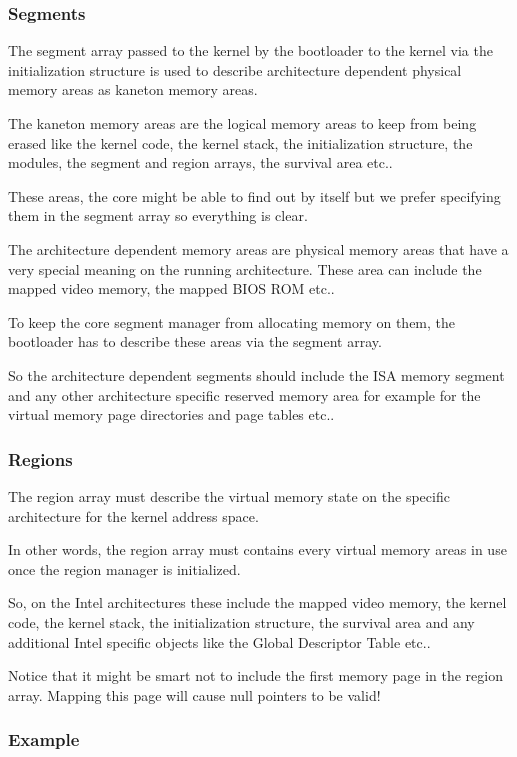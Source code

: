 \subsubsection{Segments}

The segment array passed to the kernel by the bootloader to the kernel via
the initialization structure is used to describe architecture dependent
physical memory areas as kaneton memory areas.

The kaneton memory areas are the logical memory areas to keep from being
erased like the kernel code, the kernel stack, the initialization structure,
the modules, the segment and region arrays, the survival area etc..

These areas, the core might be able to find out by itself but we prefer
specifying them in the segment array so everything is clear.

The architecture dependent memory areas are physical memory areas that
have a very special meaning on the running architecture. These area can
include the mapped video memory, the mapped BIOS ROM etc..

To keep the core segment manager from allocating memory on them, the
bootloader has to describe these areas via the segment array.

So the architecture dependent segments should include the ISA memory segment
and any other architecture specific reserved memory area for example for
the virtual memory page directories and page tables etc..

\subsubsection{Regions}

The region array must describe the virtual memory state on the specific
architecture for the kernel address space.

In other words, the region array must contains every virtual memory
areas in use once the region manager is initialized.

So, on the Intel architectures these include the mapped video memory,
the kernel code, the kernel stack, the initialization structure, the
survival area and any additional Intel specific objects like the Global
Descriptor Table etc..

Notice that it might be smart not to include the first memory page in
the region array. Mapping this page will cause null pointers to be valid!

\subsubsection{Example}

